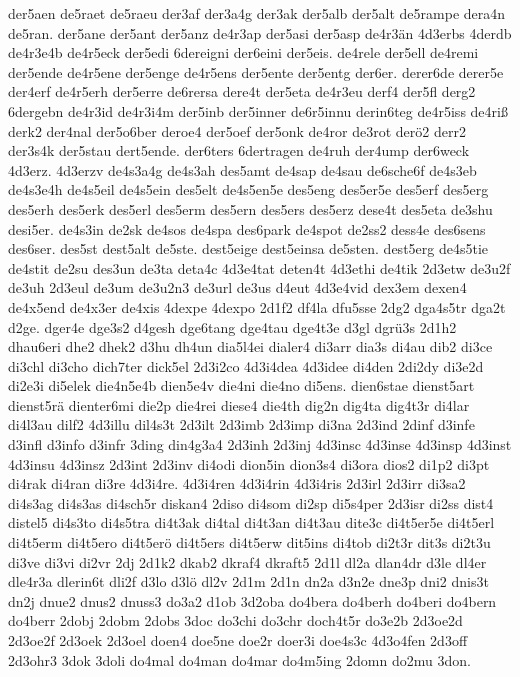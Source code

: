 {der5aen
de5raet
de5raeu
der3af
der3a4g
der3ak
der5alb
der5alt
de5rampe
dera4n
de5ran.
der5ane
der5ant
der5anz
de4r3ap
der5asi
der5asp
de4r3än
4d3erbs
4derdb
de4r3e4b
de4r5eck
der5edi
6dereigni
der6eini
der5eis.
de4rele
der5ell
de4remi
der5ende
de4r5ene
der5enge
de4r5ens
der5ente
der5entg
der6er.
derer6de
derer5e
der4erf
de4r5erh
der5erre
de6rersa
dere4t
der5eta
de4r3eu
derf4
der5fl
derg2
6dergebn
de4r3id
de4r3i4m
der5inb
der5inner
de6r5innu
derin6teg
de4r5iss
de4riß
derk2
der4nal
der5o6ber
deroe4
der5oef
der5onk
de4ror
de3rot
derö2
derr2
der3s4k
der5stau
dert5ende.
der6ters
6dertragen
de4ruh
der4ump
der6weck
4d3erz.
4d3erzv
de4s3a4g
de4s3ah
des5amt
de4sap
de4sau
de6sche6f
de4s3eb
de4s3e4h
de4s5eil
de4s5ein
des5elt
de4s5en5e
des5eng
des5er5e
des5erf
des5erg
des5erh
des5erk
des5erl
des5erm
des5ern
des5ers
des5erz
dese4t
des5eta
de3shu
desi5er.
de4s3in
de2sk
de4sos
de4spa
des6park
de4spot
de2ss2
dess4e
des6sens
des6ser.
des5st
dest5alt
de5ste.
dest5eige
dest5einsa
de5sten.
dest5erg
de4s5tie
de4stit
de2su
des3un
de3ta
deta4c
4d3e4tat
deten4t
4d3ethi
de4tik
2d3etw
de3u2f
de3uh
2d3eul
de3um
de3u2n3
de3url
de3us
d4eut
4d3e4vid
dex3em
dexen4
de4x5end
de4x3er
de4xis
4dexpe
4dexpo
2d1f2
df4la
dfu5sse
2dg2
dga4s5tr
dga2t
d2ge.
dger4e
dge3s2
d4gesh
dge6tang
dge4tau
dge4t3e
d3gl
dgrü3s
2d1h2
dhau6eri
dhe2
dhek2
d3hu
dh4un
dia5l4ei
dialer4
di3arr
dia3s
di4au
dib2
di3ce
di3chl
di3cho
dich7ter
dick5el
2d3i2co
4d3i4dea
4d3idee
di4den
2di2dy
di3e2d
di2e3i
di5elek
die4n5e4b
dien5e4v
die4ni
die4no
di5ens.
dien6stae
dienst5art
dienst5rä
dienter6mi
die2p
die4rei
diese4
die4th
dig2n
dig4ta
dig4t3r
di4lar
di4l3au
dilf2
4d3illu
dil4s3t
2d3ilt
2d3imb
2d3imp
di3na
2d3ind
2dinf
d3infe
d3infl
d3info
d3infr
3ding
din4g3a4
2d3inh
2d3inj
4d3insc
4d3inse
4d3insp
4d3inst
4d3insu
4d3insz
2d3int
2d3inv
di4odi
dion5in
dion3s4
di3ora
dios2
di1p2
di3pt
di4rak
di4ran
di3re
4d3i4re.
4d3i4ren
4d3i4rin
4d3i4ris
2d3irl
2d3irr
di3sa2
di4s3ag
di4s3as
di4sch5r
diskan4
2diso
di4som
di2sp
di5s4per
2d3isr
di2ss
dist4
distel5
di4s3to
di4s5tra
di4t3ak
di4tal
di4t3an
di4t3au
dite3c
di4t5er5e
di4t5erl
di4t5erm
di4t5ero
di4t5erö
di4t5ers
di4t5erw
dit5ins
di4tob
di2t3r
dit3s
di2t3u
di3ve
di3vi
di2vr
2dj
2d1k2
dkab2
dkraf4
dkraft5
2d1l
dl2a
dlan4dr
d3le
dl4er
dle4r3a
dlerin6t
dli2f
d3lo
d3lö
dl2v
2d1m
2d1n
dn2a
d3n2e
dne3p
dni2
dnis3t
dn2j
dnue2
dnus2
dnuss3
do3a2
d1ob
3d2oba
do4bera
do4berh
do4beri
do4bern
do4berr
2dobj
2dobm
2dobs
3doc
do3chi
do3chr
doch4t5r
do3e2b
2d3oe2d
2d3oe2f
2d3oek
2d3oel
doen4
doe5ne
doe2r
doer3i
doe4s3c
4d3o4fen
2d3off
2d3ohr3
3dok
3doli
do4mal
do4man
do4mar
do4m5ing
2domn
do2mu
3don.
}
